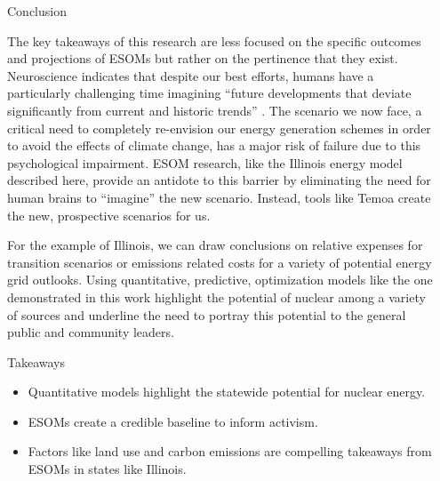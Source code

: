 \documentclass[final]{beamer}
\newlength{\sepwid}
\newlength{\onecolwid}
\newlength{\threecolwid}
\begin{document}
\begin{frame}[t]
\begin{columns}[t,totalwidth=\threecolwid]
\begin{column}{\sepwid}\end{column} %

\begin{column}{\onecolwid} %

\begin{block}{Conclusion}
\vspace{0.7em}

The key takeaways of this research are less focused on the specific outcomes and projections of ESOMs but rather on the pertinence that they exist. Neuroscience indicates that despite our best efforts, humans have a particularly challenging time imagining ``future developments that deviate significantly from current and historic trends'' \cite{psych}. The scenario we now face, a critical need to completely re-envision our energy generation schemes in order to avoid the effects of climate change, has a major risk of failure due to this psychological impairment. ESOM research, like the Illinois energy model described here, provide an antidote to this barrier by eliminating the need for human brains to ``imagine'' the new scenario. Instead, tools like Temoa create the new, prospective scenarios for us.

\vspace{0.7em}

For the example of Illinois, we can draw conclusions on relative expenses for transition scenarios or emissions related costs for a variety of potential energy grid outlooks.  Using quantitative, predictive, optimization models like the one demonstrated in this work highlight the potential of nuclear among a variety of sources and underline the need to portray this potential to the general public and community leaders.

\end{block}

\begin{alertblock}{Takeaways}
	\begin{itemize}
		\item Quantitative models highlight the statewide potential for nuclear energy.
		\item ESOMs create a credible baseline to inform activism.
		\item Factors like land use and carbon emissions are compelling takeaways from ESOMs in states like Illinois.
	\end{itemize}
\end{alertblock}



\end{column}
\end{columns}
\end{frame}
\end{document}
